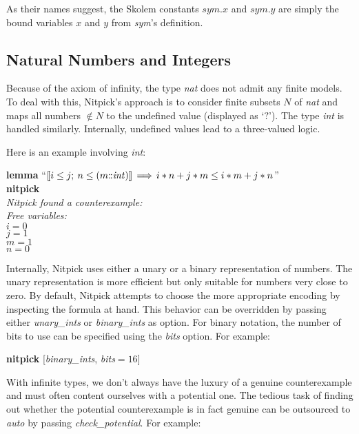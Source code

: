 \documentclass[a4paper,12pt]{article}
\def\Colon{\mathord{:\mkern-1.5mu:}}
\def\unk{{?}}
\begin{document}
As their names suggest, the Skolem constants $\mathit{sym}.x$ and
$\mathit{sym}.y$ are simply the bound variables $x$ and $y$
from \textit{sym}'s definition.

\subsection{Natural Numbers and Integers}
\label{natural-numbers-and-integers}

Because of the axiom of infinity, the type \textit{nat} does not admit any
finite models. To deal with this, Nitpick's approach is to consider finite
subsets $N$ of \textit{nat} and maps all numbers $\notin N$ to the undefined
value (displayed as `$\unk$'). The type \textit{int} is handled similarly.
Internally, undefined values lead to a three-valued logic.

Here is an example involving \textit{int\/}:

\prew
\textbf{lemma} ``$\lbrakk i \le j;\> n \le (m{\Colon}\mathit{int})\rbrakk \,\Longrightarrow\, i * n + j * m \le i * m + j * n$'' \\
\textbf{nitpick} \\[2\smallskipamount]
\slshape Nitpick found a counterexample: \\[2\smallskipamount]
\hbox{}\qquad Free variables: \nopagebreak \\
\hbox{}\qquad\qquad $i = 0$ \\
\hbox{}\qquad\qquad $j = 1$ \\
\hbox{}\qquad\qquad $m = 1$ \\
\hbox{}\qquad\qquad $n = 0$
\postw

Internally, Nitpick uses either a unary or a binary representation of numbers.
The unary representation is more efficient but only suitable for numbers very
close to zero. By default, Nitpick attempts to choose the more appropriate
encoding by inspecting the formula at hand. This behavior can be overridden by
passing either \textit{unary\_ints} or \textit{binary\_ints} as option. For
binary notation, the number of bits to use can be specified using
the \textit{bits} option. For example:

\prew
\textbf{nitpick} [\textit{binary\_ints}, \textit{bits}${} = 16$]
\postw

With infinite types, we don't always have the luxury of a genuine counterexample
and must often content ourselves with a potential one. The tedious task of
finding out whether the potential counterexample is in fact genuine can be
outsourced to \textit{auto} by passing \textit{check\_potential}. For example:
\end{document}
